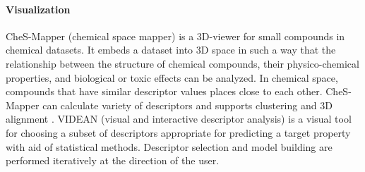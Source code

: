 \paragraph{Visualization}
CheS-Mapper (chemical space mapper) is a 3D-viewer for small compounds in chemical datasets. It embeds a dataset into 3D space in such a way that the relationship between the structure of chemical compounds, their physico-chemical properties, and biological or toxic effects can be analyzed. In chemical space, compounds that have similar descriptor values places close to each other. CheS-Mapper can calculate variety of descriptors and supports clustering and 3D alignment \cite{G_tlein_2012}\cite{G_tlein_2014}. 
VIDEAN (visual and interactive descriptor analysis) \cite{Mart_nez_2015} is a visual tool for choosing a subset of descriptors appropriate for predicting a target property with aid of statistical methods.  Descriptor selection and model building are performed iteratively at the direction of the user.
